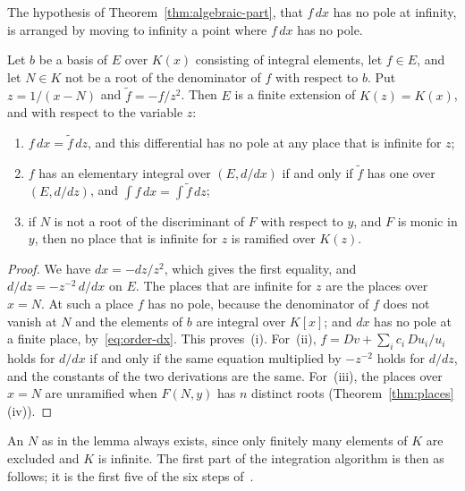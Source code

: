 The hypothesis of Theorem~\ref{thm:algebraic-part}, that $f\,dx$ has no pole
at infinity, is arranged by moving to infinity a point where $f\,dx$ has no
pole.

\begin{lemma}\label{lem:change-variable}
Let $b$ be a basis of $E$ over $K(x)$ consisting of integral elements, let $f
\in E$, and let $N \in K$ not be a root of the denominator of $f$ with respect
to $b$. Put $z = 1/(x - N)$ and $\tilde f = -f/z^2$. Then $E$ is a finite
extension of $K(z) = K(x)$, and with respect to the variable $z$:
\begin{enumerate}[label=\textup{(\roman*)}]
\item $f\,dx = \tilde f\,dz$, and this differential has no pole at any place
  that is infinite for $z$;
\item $f$ has an elementary integral over $(E, d/dx)$ if and only if $\tilde
  f$ has one over $(E, d/dz)$, and $\int f\,dx = \int \tilde f\,dz$;
\item if $N$ is not a root of the discriminant of $F$ with respect to $y$,
  and $F$ is monic in $y$, then no place that is infinite for $z$ is
  ramified over $K(z)$.
\end{enumerate}
\end{lemma}

\begin{proof}
We have $dx = -dz/z^2$, which gives the first equality, and $d/dz = -z^{-2}\,
d/dx$ on $E$. The places that are infinite for $z$ are the places over $x =
N$. At such a place $f$ has no pole, because the denominator of $f$ does not
vanish at $N$ and the elements of $b$ are integral over $K[x]$; and $dx$ has
no pole at a finite place, by~\eqref{eq:order-dx}. This proves~(i). For~(ii),
$f = Dv + \sum_i c_i\, Du_i / u_i$ holds for $d/dx$ if and only if the same
equation multiplied by $-z^{-2}$ holds for $d/dz$, and the constants of the
two derivations are the same. For~(iii), the places over $x = N$ are
unramified when $F(N, y)$ has $n$ distinct roots
(Theorem~\ref{thm:places}(iv)).
\end{proof}

An $N$ as in the lemma always exists, since only finitely many elements of
$K$ are excluded and $K$ is infinite. The first part of the integration
algorithm is then as follows; it is the first five of the six steps
of~\cite[\S2.4]{bronstein1998tutorial}.

